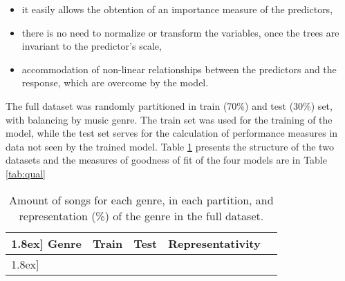 \documentclass[twocolumn]{article}
\begin{document}
\begin{itemize}
\item it easily allows the obtention of an 
importance measure of the predictors, 
\item there is no need to normalize or transform the variables, once the trees are invariant to the predictor's scale,
\item accommodation of non-linear relationships between the predictors and the response,
which are overcome by the model. 
\end{itemize}

The full dataset was randomly partitioned in train \thinspace (70\%) and test
\thinspace (30\%) set, with balancing by music
genre. The train set was used for the training of the model, while the test set serves for the calculation
of  performance measures in data not seen by the 
trained model. Table \ref{tab:descrip} presents 
the structure of the two datasets and 
the measures of goodness of fit of the four models
are in Table \ref{tab:qual}

\begin{table}[ht] \centering 
  \caption{Amount of songs for each genre, 
  in each partition, and representation (\%) of the genre in the full dataset.} 
  \label{} 
  \small
  \vspace{3mm}
\begin{tabular}{lllll} 
\-1.8ex] 
Genre & \multicolumn{1}{l}{Train} & \multicolumn{1}{l}{Test} &
\multicolumn{1}{l}{Representativity}  \\ 
\hline \-1.8ex] 
\end{tabular} 
\label{tab:descrip}
\end{table} 
\end{document}
